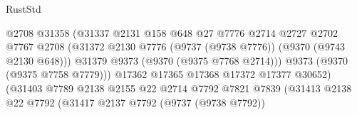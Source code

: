 \begin{lexlean}{RustStd}
\begin{coremodule}
{\begin{coremodule}
{{{{{{{{{{{{{{{{{{{{{{{{{{{{{{{{{{{{{{{                                                @2708
                                                @31358
                                                (@31337
                                                  @2131
                                                  @158
                                                  @648
                                                  @27
                                                  @7776
                                                  @2714
                                                  @2727
                                                  @2702
                                                  @7767
                                                  @2708
                                                  (@31372
                                                    @2130
                                                    @7776
                                                    (@9737 (@9738 @7776))
                                                    (@9370 (@9743 @2130 @648)))
                                                  @31379
                                                  @9373
                                                  (@9370 (@9375 @7768 @2714)))
                                                @9373
                                                (@9370 (@9375 @7758 @7779)))
                                              @17362
                                              @17365
                                              @17368
                                              @17372
                                              @17377
                                              @30652)
                                            (@31403
                                              @7789
                                              @2138
                                              @2155
                                              @22
                                              @2714
                                              @7792
                                              @7821
                                              @7839
                                              (@31413
                                                @2138
                                                @22
                                                @7792
                                                (@31417
                                                  @2137
                                                  @7792
                                                  (@9737 (@9738 @7792))
}}}}}}}}}}}}}}}}}}}}}}}}}}}}}}}}}}}}}}}
\end{coremodule}}
\end{coremodule}
\end{lexlean}
